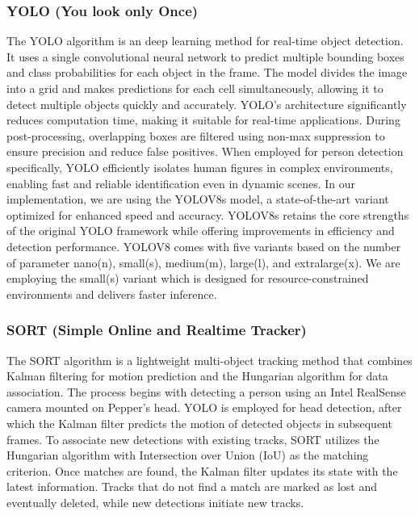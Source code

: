 \documentclass{CSSRforAfrica}
\begin{document}
\subsubsection*{YOLO (You look only Once)}
The YOLO algorithm is an deep learning method for real-time object detection. It uses a single convolutional neural network to predict multiple bounding boxes and class probabilities for each object in the frame. The model divides the image into a grid and makes predictions for each cell simultaneously, allowing it to detect multiple objects quickly and accurately. YOLO’s architecture significantly reduces computation time, making it suitable for real-time applications. During post-processing, overlapping boxes are filtered using non-max suppression to ensure precision and reduce false positives. When employed for person detection specifically, YOLO efficiently isolates human figures in complex environments, enabling fast and reliable identification even in dynamic scenes. In our implementation, we are using the YOLOV8s model, a state-of-the-art variant optimized for enhanced speed and accuracy. YOLOV8s retains the core strengths of the original YOLO framework while offering improvements in efficiency and detection performance. YOLOV8 comes with five variants based on the number of parameter nano(n), small(s), medium(m), large(l), and extralarge(x). We are employing the small(s) variant which is designed for resource-constrained environments and delivers faster inference.

\subsubsection*{SORT (Simple Online and Realtime Tracker)}
The SORT algorithm is a lightweight multi-object tracking method that combines Kalman filtering for motion prediction and the Hungarian algorithm for data association. The process begins with detecting a person using an Intel RealSense camera mounted on Pepper's head. YOLO is employed for head detection, after which the Kalman filter predicts the motion of detected objects in subsequent frames. To associate new detections with existing tracks, SORT utilizes the Hungarian algorithm with Intersection over Union (IoU) as the matching criterion. Once matches are found, the Kalman filter updates its state with the latest information. Tracks that do not find a match are marked as lost and eventually deleted, while new detections initiate new tracks.\cite{SORT}
\end{document}
